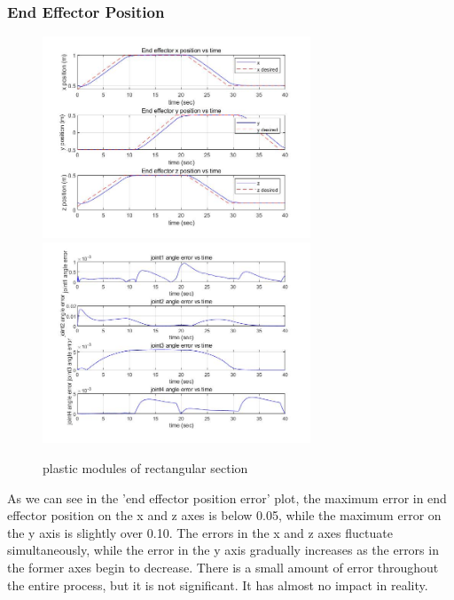 \subsubsection*{End Effector Position}

\begin{figure}[htbp]
    \centering
    \includegraphics[width=8cm]{./fig/5.jpg}
    \includegraphics[width=8cm]{./fig/7.jpg}
    \caption{plastic modules of rectangular section}
    \label{f1}
\end{figure}

As we can see in the 'end effector position error' plot, the maximum error in end effector position on the x and z axes is below 0.05, while the maximum error on the y axis is slightly over 0.10. The errors in the x and z axes fluctuate simultaneously, while the error in the y axis gradually increases as the errors in the former axes begin to decrease. There is a small amount of error throughout the entire process, but it is not significant. It has almost no impact in reality.